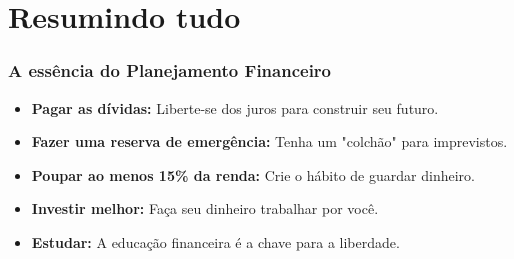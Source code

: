 \section{Resumindo tudo}

\begin{frame}[c]\frametitle{A essência do Planejamento Financeiro}
  \begin{itemize}
    \item {\textbf{Pagar as dívidas:}} Liberte-se dos juros para construir seu futuro.
    \item {\textbf{Fazer uma reserva de emergência:}} Tenha um "colchão" para imprevistos.
    \item {\textbf{Poupar ao menos 15\% da renda:}} Crie o hábito de guardar dinheiro.
    \item {\textbf{Investir melhor:}} Faça seu dinheiro trabalhar por você.
    \item {\textbf{Estudar:}} A educação financeira é a chave para a liberdade.
  \end{itemize}
\end{frame}
